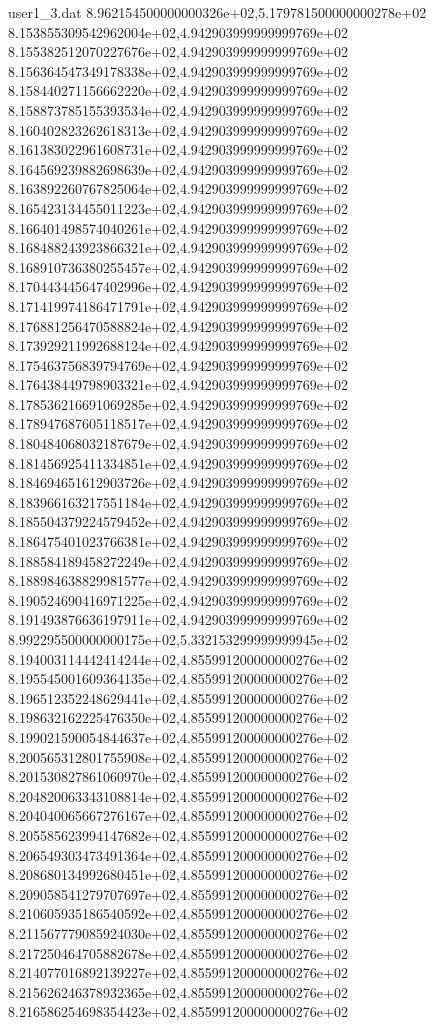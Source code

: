 \begin{filecontents}{user1_3.dat}
8.962154500000000326e+02,5.179781500000000278e+02
8.153855309542962004e+02,4.942903999999999769e+02
8.155382512070227676e+02,4.942903999999999769e+02
8.156364547349178338e+02,4.942903999999999769e+02
8.158440271156662220e+02,4.942903999999999769e+02
8.158873785155393534e+02,4.942903999999999769e+02
8.160402823262618313e+02,4.942903999999999769e+02
8.161383022961608731e+02,4.942903999999999769e+02
8.164569239882698639e+02,4.942903999999999769e+02
8.163892260767825064e+02,4.942903999999999769e+02
8.165423134455011223e+02,4.942903999999999769e+02
8.166401498574040261e+02,4.942903999999999769e+02
8.168488243923866321e+02,4.942903999999999769e+02
8.168910736380255457e+02,4.942903999999999769e+02
8.170443445647402996e+02,4.942903999999999769e+02
8.171419974186471791e+02,4.942903999999999769e+02
8.176881256470588824e+02,4.942903999999999769e+02
8.173929211992688124e+02,4.942903999999999769e+02
8.175463756839794769e+02,4.942903999999999769e+02
8.176438449798903321e+02,4.942903999999999769e+02
8.178536216691069285e+02,4.942903999999999769e+02
8.178947687605118517e+02,4.942903999999999769e+02
8.180484068032187679e+02,4.942903999999999769e+02
8.181456925411334851e+02,4.942903999999999769e+02
8.184694651612903726e+02,4.942903999999999769e+02
8.183966163217551184e+02,4.942903999999999769e+02
8.185504379224579452e+02,4.942903999999999769e+02
8.186475401023766381e+02,4.942903999999999769e+02
8.188584189458272249e+02,4.942903999999999769e+02
8.188984638829981577e+02,4.942903999999999769e+02
8.190524690416971225e+02,4.942903999999999769e+02
8.191493876636197911e+02,4.942903999999999769e+02
8.992295500000000175e+02,5.332153299999999945e+02
8.194003114442414244e+02,4.855991200000000276e+02
8.195545001609364135e+02,4.855991200000000276e+02
8.196512352248629441e+02,4.855991200000000276e+02
8.198632162225476350e+02,4.855991200000000276e+02
8.199021590054844637e+02,4.855991200000000276e+02
8.200565312801755908e+02,4.855991200000000276e+02
8.201530827861060970e+02,4.855991200000000276e+02
8.204820063343108814e+02,4.855991200000000276e+02
8.204040065667276167e+02,4.855991200000000276e+02
8.205585623994147682e+02,4.855991200000000276e+02
8.206549303473491364e+02,4.855991200000000276e+02
8.208680134992680451e+02,4.855991200000000276e+02
8.209058541279707697e+02,4.855991200000000276e+02
8.210605935186540592e+02,4.855991200000000276e+02
8.211567779085924030e+02,4.855991200000000276e+02
8.217250464705882678e+02,4.855991200000000276e+02
8.214077016892139227e+02,4.855991200000000276e+02
8.215626246378932365e+02,4.855991200000000276e+02
8.216586254698354423e+02,4.855991200000000276e+02

\end{filecontents}
